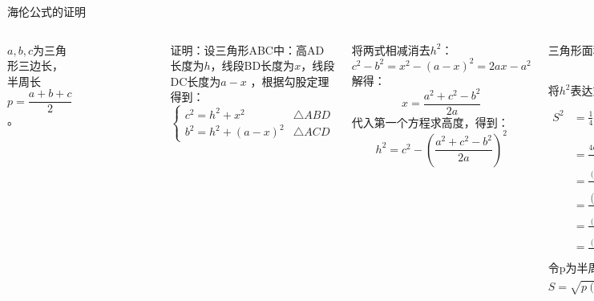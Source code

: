 \documentclass{beamer}
\begin{document}
\begin{frame}[t]{海伦公式的证明}
\begin{columns}
$a,b,c$为三角形三边长，半周长 $p = \dfrac{a+b+c}{2}$。
\begin{figure}[htbp]
\centering
{}
\end{figure}

证明：设三角形ABC中：高AD长度为$h$，线段BD长度为$x$，线段DC长度为$a-x$ ，根据勾股定理得到：
$$
\begin{cases}
c^2 = h^2 + x^2 & \text{$\triangle ABD$} \\
b^2 = h^2 + (a-x)^2 & \text{$\triangle ACD$}
\end{cases}
$$

将两式相减消去$h^2$：
$$c^2 - b^2 = x^2 - (a-x)^2 = 2ax - a^2$$
解得：$$x = \frac{a^2 + c^2 - b^2}{2a}$$
代入第一个方程求高度，得到：
$$h^2 = c^2 - \left( \frac{a^2 + c^2 - b^2}{2a} \right)^2$$

三角形面积表达式：
$$S = \frac{1}{2}ah \Rightarrow S^2 = \frac{a^2}{4}h^2$$
将$h^2$表达式代入：
\begin{align*}
S^2 &= \frac{1}{4}a^2 \left[ c^2 - \frac{(a^2 + c^2 - b^2)^2}{4a^2} \right ] \\
&= \frac{4a^2c^2 - (a^2+c^2-b^2)^2}{16}\\
&=\frac{(2ac)^2 - (a^2+c^2-b^2)^2}{16} \\
&=\frac{(2ac+a^2+c^2-b^2)(2ac-a^2-c^2+b^2)}{16}\\
&=\frac{(a+b+c)(a+c-b)(a+b-c)(b+c-a)}{16} \\
&=\frac{(a+b+c)}{2}\frac{(a+c-b)}{2}\frac{(a+b-c)}{2}\frac{(b+c-a)}{2}
\end{align*}
令p为半周长，即：$p=\dfrac{a+b+c}{2}$，则：\\
$S=\sqrt{p(p-a)(p-b)(p-c)}$
\end{columns}
\end{frame}
\end{document}
